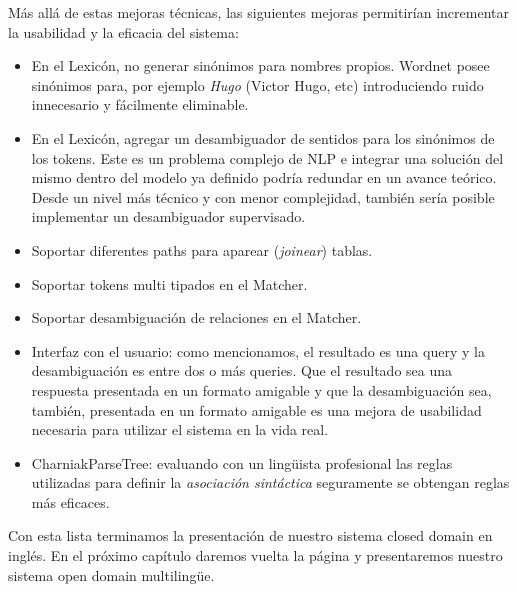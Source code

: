 Más allá de estas mejoras técnicas, las siguientes mejoras permitirían incrementar la usabilidad y la eficacia del sistema:

\begin{itemize}
\item En el Lexicón, no generar sinónimos para nombres propios. Wordnet posee sinónimos para, por ejemplo \textit{Hugo} (Victor Hugo, etc) introduciendo ruido innecesario y fácilmente eliminable.
\item En el Lexicón, agregar un desambiguador de sentidos para los sinónimos de los tokens. Este es un problema complejo de NLP e integrar una solución del mismo dentro del modelo ya definido podría redundar en un avance teórico. Desde un nivel más técnico y con menor complejidad, también sería posible implementar un desambiguador supervisado.
\item Soportar diferentes paths para aparear (\textit{joinear}) tablas.
\item Soportar tokens multi tipados en el Matcher.
\item Soportar desambiguación de relaciones en el Matcher.
\item Interfaz con el usuario: como mencionamos, el resultado es una query y la desambiguación es entre dos o más queries. Que el resultado sea una respuesta presentada en un formato amigable y que la desambiguación sea, también, presentada en un formato amigable es una mejora de usabilidad necesaria para utilizar el sistema en la vida real.
\item CharniakParseTree: evaluando con un lingüista profesional las reglas utilizadas para definir la \textit{asociación sintáctica} seguramente se obtengan reglas más eficaces.

\end{itemize}

Con esta lista terminamos la presentación de nuestro sistema closed domain en inglés. En el próximo capítulo daremos vuelta la página y presentaremos nuestro sistema open domain multilingüe.